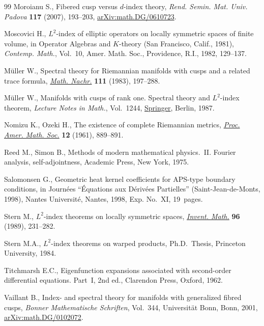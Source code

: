 \begin{thebibliography}{99}
Moroianu S., Fibered cusp versus {$d$}-index theory, \textit{Rend. Semin. Mat.
 Univ. Padova} \textbf{117} (2007), 193--203, \href{https://arxiv.org/abs/math.DG/0610723}{arXiv:math.DG/0610723}.

Moscovici H., {$L^{2}$}-index of elliptic operators on locally symmetric spaces
 of finite volume, in Operator Algebras and {$K$}-theory ({S}an {F}rancisco,
 {C}alif., 1981), \textit{Contemp. Math.}, Vol.~10, Amer. Math. Soc.,
 Providence, R.I., 1982, 129--137.

M\"uller W., Spectral theory for {R}iemannian manifolds with cusps and a
 related trace formula, \href{https://doi.org/10.1002/mana.19831110109}{\textit{Math. Nachr.}} \textbf{111} (1983), 197--288.

M\"uller W., Manifolds with cusps of rank one. {S}pectral theory and
 {$L^2$}-index theorem, \textit{Lecture Notes in Math.}, Vol.~1244,
 \href{https://doi.org/10.1007/BFb0077660}{Springer}, Berlin, 1987.

Nomizu K., Ozeki H., The existence of complete {R}iemannian metrics,
 \href{https://doi.org/10.2307/2034383}{\textit{Proc. Amer. Math. Soc.}} \textbf{12} (1961), 889--891.

Reed M., Simon B., Methods of modern mathematical physics.~{II}. {F}ourier
 analysis, self-adjointness, Academic Press, New York, 1975.

Salomonsen G., Geometric heat kernel coefficients for {APS}-type boundary
 conditions, in Journ\'ees ``\'Equations aux {D}\'eriv\'ees {P}artielles''
 ({S}aint-{J}ean-de-{M}onts, 1998), Nantes Universit\'e, Nantes, 1998, Exp.
 No.~XI, 19~pages.

Stern M., {$L^2$}-index theorems on locally symmetric spaces, \href{https://doi.org/10.1007/BF01393964}{\textit{Invent.
 Math.}} \textbf{96} (1989), 231--282.

Stern M.A., {$L^2$}-index theorems on warped products, Ph.D.~Thesis,
 {P}rinceton University, 1984.

Titchmarsh E.C., Eigenfunction expansions associated with second-order
 differential equations. {P}art~{I}, 2nd ed., Clarendon Press, Oxford, 1962.

Vaillant B., Index- and spectral theory for manifolds with generalized fibred
 cusps, \textit{Bonner Mathematische Schriften}, Vol.~344, Universit\"at Bonn,
 Bonn, 2001, \href{https://arxiv.org/abs/math.DG/0102072}{arXiv:math.DG/0102072}.

\end{thebibliography}
